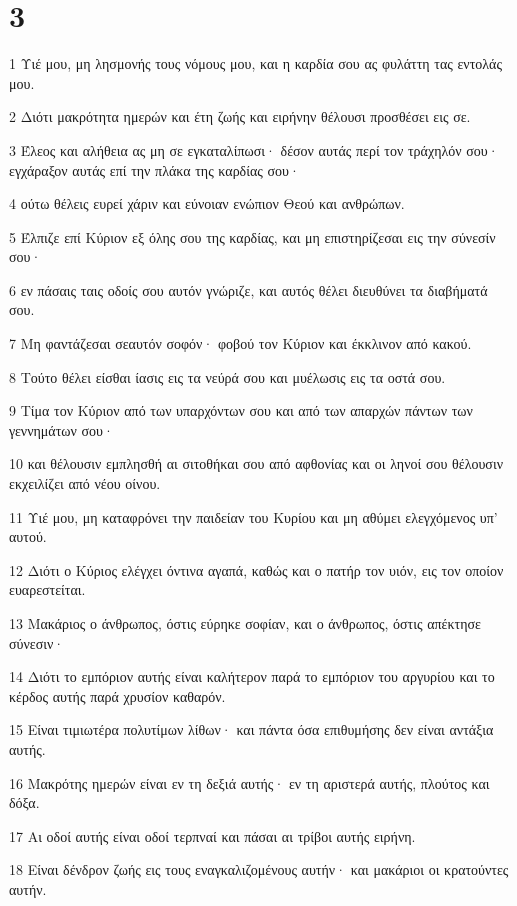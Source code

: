 \chapter{3}

\par 1 Υιέ μου, μη λησμονής τους νόμους μου, και η καρδία σου ας φυλάττη τας εντολάς μου.
\par 2 Διότι μακρότητα ημερών και έτη ζωής και ειρήνην θέλουσι προσθέσει εις σε.
\par 3 Έλεος και αλήθεια ας μη σε εγκαταλίπωσι· δέσον αυτάς περί τον τράχηλόν σου· εγχάραξον αυτάς επί την πλάκα της καρδίας σου·
\par 4 ούτω θέλεις ευρεί χάριν και εύνοιαν ενώπιον Θεού και ανθρώπων.
\par 5 Έλπιζε επί Κύριον εξ όλης σου της καρδίας, και μη επιστηρίζεσαι εις την σύνεσίν σου·
\par 6 εν πάσαις ταις οδοίς σου αυτόν γνώριζε, και αυτός θέλει διευθύνει τα διαβήματά σου.
\par 7 Μη φαντάζεσαι σεαυτόν σοφόν· φοβού τον Κύριον και έκκλινον από κακού.
\par 8 Τούτο θέλει είσθαι ίασις εις τα νεύρά σου και μυέλωσις εις τα οστά σου.
\par 9 Τίμα τον Κύριον από των υπαρχόντων σου και από των απαρχών πάντων των γεννημάτων σου·
\par 10 και θέλουσιν εμπλησθή αι σιτοθήκαι σου από αφθονίας και οι ληνοί σου θέλουσιν εκχειλίζει από νέου οίνου.
\par 11 Υιέ μου, μη καταφρόνει την παιδείαν του Κυρίου και μη αθύμει ελεγχόμενος υπ' αυτού.
\par 12 Διότι ο Κύριος ελέγχει όντινα αγαπά, καθώς και ο πατήρ τον υιόν, εις τον οποίον ευαρεστείται.
\par 13 Μακάριος ο άνθρωπος, όστις εύρηκε σοφίαν, και ο άνθρωπος, όστις απέκτησε σύνεσιν·
\par 14 Διότι το εμπόριον αυτής είναι καλήτερον παρά το εμπόριον του αργυρίου και το κέρδος αυτής παρά χρυσίον καθαρόν.
\par 15 Είναι τιμιωτέρα πολυτίμων λίθων· και πάντα όσα επιθυμήσης δεν είναι αντάξια αυτής.
\par 16 Μακρότης ημερών είναι εν τη δεξιά αυτής· εν τη αριστερά αυτής, πλούτος και δόξα.
\par 17 Αι οδοί αυτής είναι οδοί τερπναί και πάσαι αι τρίβοι αυτής ειρήνη.
\par 18 Είναι δένδρον ζωής εις τους εναγκαλιζομένους αυτήν· και μακάριοι οι κρατούντες αυτήν.
